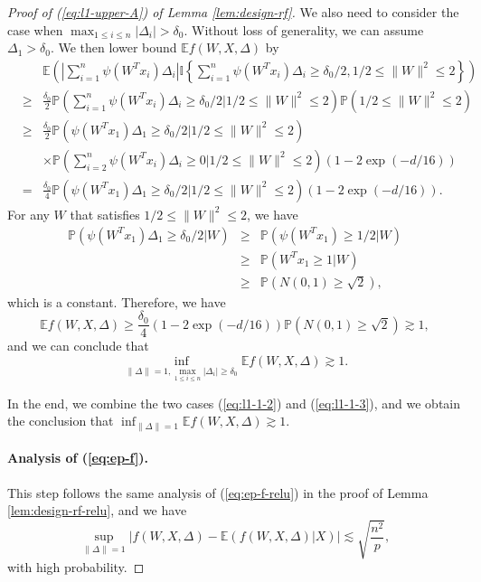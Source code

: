 \begin{proof}[Proof of (\ref{eq:l1-upper-A}) of Lemma \ref{lem:design-rf}]
We also need to consider the case when $\max_{1\leq i\leq n}|\Delta_i|> \delta_0$. Without loss of generality, we can assume $\Delta_1>\delta_0$.
We then lower bound $\mathbb{E}f(W,X,\Delta)$ by
\begin{eqnarray*}
&& \mathbb{E}\left(\left|\sum_{i=1}^n\psi(W^Tx_i)\Delta_i\right|\mathbb{I}\left\{\sum_{i=1}^n\psi(W^Tx_i)\Delta_i \geq \delta_0/2, 1/2\leq \|W\|^2\leq 2\right\}\right) \\
&\geq& \frac{\delta_0}{2} \mathbb{P}\left(\sum_{i=1}^n\psi(W^Tx_i)\Delta_i \geq \delta_0/2\Big| 1/2\leq \|W\|^2\leq 2\right)\mathbb{P}\left(1/2\leq \|W\|^2\leq 2\right) \\
&\geq& \frac{\delta_0}{2} \mathbb{P}\left(\psi(W^Tx_1)\Delta_1 \geq \delta_0/2\Big|1/2\leq \|W\|^2\leq 2\right) \\
&& \times \mathbb{P}\left(\sum_{i=2}^n\psi(W^Tx_i)\Delta_i \geq 0\Big|1/2\leq \|W\|^2\leq 2\right)\left(1-2\exp(-d/16)\right) \\
&=& \frac{\delta_0}{4} \mathbb{P}\left(\psi(W^Tx_1)\Delta_1 \geq \delta_0/2\Big|1/2\leq \|W\|^2\leq 2\right)\left(1-2\exp(-d/16)\right).
\end{eqnarray*}
For any $W$ that satisfies $1/2\leq \|W\|^2\leq 2$, we have
\begin{eqnarray*}
\mathbb{P}\left(\psi(W^Tx_1)\Delta_1 \geq \delta_0/2\Big|W\right) &\geq& \mathbb{P}\left(\psi(W^Tx_1)\geq 1/2\Big|W\right) \\
&\geq&  \mathbb{P}\left(W^Tx_1\geq 1\Big|W\right) \\
&\geq& \mathbb{P}\left(N(0,1)\geq \sqrt{2}\right),
\end{eqnarray*}
which is a constant.
Therefore, we have
$$\mathbb{E}f(W,X,\Delta)\geq \frac{\delta_0}{4}\left(1-2\exp(-d/16)\right)\mathbb{P}\left(N(0,1)\geq \sqrt{2}\right)\gtrsim 1,$$
and we can conclude that
\begin{equation}
\inf_{\|\Delta\|=1, \max_{1\leq i\leq n}|\Delta_i|\geq\delta_0}\mathbb{E}f(W,X,\Delta) \gtrsim 1.\label{eq:l1-1-3}
\end{equation}

In the end, we combine the two cases (\ref{eq:l1-1-2}) and (\ref{eq:l1-1-3}),  and we obtain the conclusion that $\inf_{\|\Delta\|=1}\mathbb{E}f(W,X,\Delta)\gtrsim 1$.


\paragraph{Analysis of (\ref{eq:ep-f}).} This step follows the same analysis of (\ref{eq:ep-f-relu}) in the proof of Lemma \ref{lem:design-rf-relu}, and we have
$$\sup_{\|\Delta\|=1}\left|f(W,X,\Delta)-\mathbb{E}(f(W,X,\Delta)|X)\right|\lesssim \sqrt{\frac{n^2}{p}},$$
with high probability.


\end{proof}
